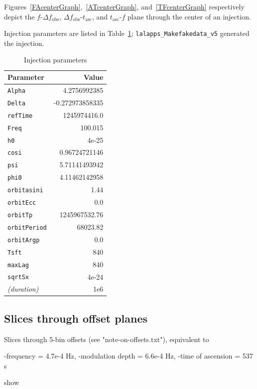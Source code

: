 \documentclass{article}
\begin{document}
Figures~\ref{FAcenterGraph},~\ref{ATcenterGraph}, and~\ref{TFcenterGraph} respectively depict the $f$-$\Delta f_\mathrm{obs}$, $\Delta f_\mathrm{obs}$-$t_\mathrm{asc}$, and $t_\mathrm{asc}$-$f$ plane through the center of an injection. 

Injection parameters are listed in Table~\ref{injection_table}; \texttt{lalapps\_Makefakedata\_v5} generated the injection.

\begin{center}
\begin{table}
\begin{tabular}{lr}
\textbf{Parameter} & \textbf{Value}\\
\hline
\texttt{Alpha} & 4.2756992385\\
\texttt{Delta} & -0.272973858335\\
\texttt{refTime} & 1245974416.0\\
\texttt{Freq} & 100.015\\
\texttt{h0} & 4e-25\\
\texttt{cosi} & 0.96724721146\\
\texttt{psi} & 5.71141493942\\
\texttt{phi0} & 4.11462142958\\
\texttt{orbitasini} & 1.44\\
\texttt{orbitEcc} & 0.0\\
\texttt{orbitTp} & 1245967532.76\\
\texttt{orbitPeriod} & 68023.82\\
\texttt{orbitArgp} & 0.0\\
\hline
\texttt{Tsft} & 840\\
\texttt{maxLag} & 840\\
\texttt{sqrtSx} & 4e-24\\
\hline
\textit{(duration)} & 1e6
\end{tabular}
\label{injection_table}
\caption{Injection parameters}
\end{table}
\end{center}

\subsection{Slices through offset planes}

Slices through 5-bin offsets (see "note-on-offsets.txt"), equivalent to

    -frequency = 4.7e-4 Hz,
    -modulation depth = 6.6e-4 Hz,
    -time of ascension = 537 s

show
\end{document}
